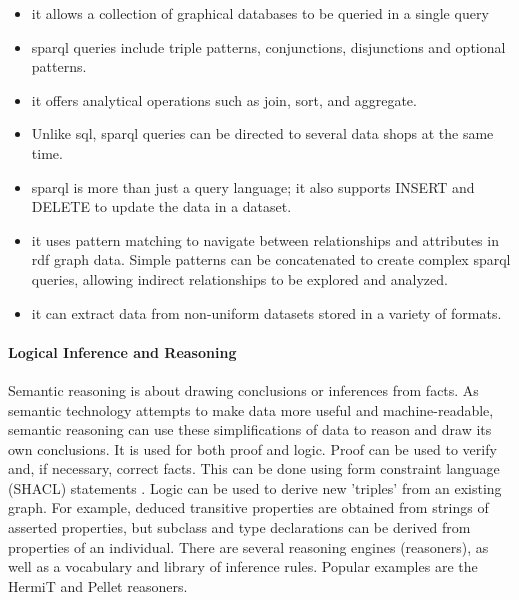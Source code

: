             \begin{itemize}
                \item it allows a collection of graphical databases to be queried in a single query 
                \item \acrshort{sparql} queries include triple patterns, conjunctions, disjunctions and optional patterns. 
                \item it offers analytical operations such as join, sort, and aggregate. 
                \item Unlike \acrshort{sql}, \acrshort{sparql} queries can be directed to several data shops at the same time. 
                \item \acrshort{sparql} is more than just a query language; it also supports INSERT and DELETE to update the data in a dataset.
                \item it uses pattern matching to navigate between relationships and attributes in \acrshort{rdf} graph data. Simple patterns can be concatenated to create complex \acrshort{sparql} queries, allowing indirect relationships to be explored and analyzed. 
                \item it can extract data from non-uniform datasets stored in a variety of formats.
            \end{itemize}


            \paragraph{Logical Inference and Reasoning \label{para:logInf}}
            Semantic reasoning is about drawing conclusions or inferences from facts. As semantic technology attempts to make data more useful and machine-readable, semantic reasoning can use these simplifications of data to reason and draw its own conclusions. It is used for both proof and logic. Proof can be used to verify and, if necessary, correct facts. This can be done using form constraint language (SHACL) statements \cite{spelten2023simulation}. Logic can be used to derive new 'triples' from an existing graph. For example, deduced transitive properties are obtained from strings of asserted properties, but subclass and type declarations can be derived from properties of an individual. There are several reasoning engines (reasoners), as well as a vocabulary and library of inference rules. Popular examples are the HermiT \cite{spelten2023simulation} and Pellet \cite{spelten2023simulation, chen2012recommendation} reasoners.\\
        

